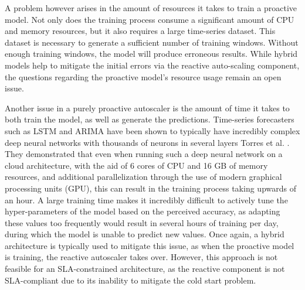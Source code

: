A problem however arises in the amount of resources it takes to train a proactive model. Not only does the training process consume a significant amount of CPU and memory resources, but it also requires a large time-series dataset. This dataset is necessary to generate a sufficient number of training windows. Without enough training windows, the model will produce erroneous results. While hybrid models help to mitigate the initial errors via the reactive auto-scaling component, the questions regarding the proactive model's resource usage remain an open issue.\par


Another issue in a purely proactive autoscaler is the amount of time it takes to both train the model, as well as generate the predictions. Time-series forecasters such as LSTM and ARIMA have been shown to typically have incredibly complex deep neural networks with thousands of neurons in several layers Torres et al. \cite{torres2021deep}. They demonstrated that even when running such a deep neural network on a cloud architecture, with the aid of 6 cores of CPU and 16 GB of memory resources, and additional parallelization through the use of modern graphical processing units (GPU), this can result in the training process taking upwards of an hour. A large training time makes it incredibly difficult to actively tune the hyper-parameters of the model based on the perceived accuracy, as adapting these values too frequently would result in several hours of training per day, during which the model is unable to predict new values. Once again, a hybrid architecture is typically used to mitigate this issue, as when the proactive model is training, the reactive autoscaler takes over. However, this approach is not feasible for an SLA-constrained architecture, as the reactive component is not SLA-compliant due to its inability to mitigate the cold start problem.\par


